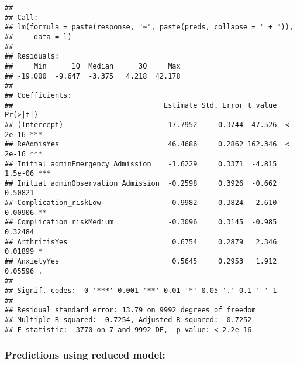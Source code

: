 \documentclass[
]{article}
\newenvironment{Shaded}{\begin{snugshade}}{\end{snugshade}}
\newcommand{\CommentTok}[1]{\textcolor[rgb]{0.56,0.35,0.01}{\textit{#1}}}
\newcommand{\FunctionTok}[1]{\textcolor[rgb]{0.00,0.00,0.00}{#1}}
\newcommand{\NormalTok}[1]{#1}
\newcommand{\SpecialCharTok}[1]{\textcolor[rgb]{0.00,0.00,0.00}{#1}}
\begin{document}
\begin{Shaded}
\end{Shaded}

\begin{verbatim}
## 
## Call:
## lm(formula = paste(response, "~", paste(preds, collapse = " + ")), 
##     data = l)
## 
## Residuals:
##     Min      1Q  Median      3Q     Max 
## -19.000  -9.647  -3.375   4.218  42.178 
## 
## Coefficients:
##                                    Estimate Std. Error t value Pr(>|t|)    
## (Intercept)                         17.7952     0.3744  47.526  < 2e-16 ***
## ReAdmisYes                          46.4686     0.2862 162.346  < 2e-16 ***
## Initial_adminEmergency Admission    -1.6229     0.3371  -4.815  1.5e-06 ***
## Initial_adminObservation Admission  -0.2598     0.3926  -0.662  0.50821    
## Complication_riskLow                 0.9982     0.3824   2.610  0.00906 ** 
## Complication_riskMedium             -0.3096     0.3145  -0.985  0.32484    
## ArthritisYes                         0.6754     0.2879   2.346  0.01899 *  
## AnxietyYes                           0.5645     0.2953   1.912  0.05596 .  
## ---
## Signif. codes:  0 '***' 0.001 '**' 0.01 '*' 0.05 '.' 0.1 ' ' 1
## 
## Residual standard error: 13.79 on 9992 degrees of freedom
## Multiple R-squared:  0.7254, Adjusted R-squared:  0.7252 
## F-statistic:  3770 on 7 and 9992 DF,  p-value: < 2.2e-16
\end{verbatim}

\hypertarget{predictions-using-reduced-model}{%
\subsubsection{Predictions using reduced
model:}\label{predictions-using-reduced-model}}
\end{document}
